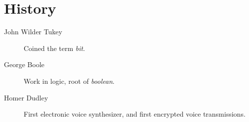 \chapter{History}

\begin{description}
  \item[John Wilder Tukey] Coined the term \textit{bit}.
  \item[George Boole] Work in logic, root of \textit{boolean}.
  \item[Homer Dudley] First electronic voice synthesizer, and first encrypted
                      voice transmissions.
\end{description}
